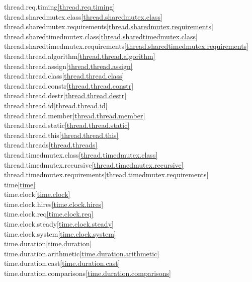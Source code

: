\begin{multicols}{2}
thread.req.timing\quad\ref{thread.req.timing}\\
thread.sharedmutex.class\quad\ref{thread.sharedmutex.class}\\
thread.sharedmutex.requirements\quad\ref{thread.sharedmutex.requirements}\\
thread.sharedtimedmutex.class\quad\ref{thread.sharedtimedmutex.class}\\
thread.sharedtimedmutex.requirements\quad\ref{thread.sharedtimedmutex.requirements}\\
thread.thread.algorithm\quad\ref{thread.thread.algorithm}\\
thread.thread.assign\quad\ref{thread.thread.assign}\\
thread.thread.class\quad\ref{thread.thread.class}\\
thread.thread.constr\quad\ref{thread.thread.constr}\\
thread.thread.destr\quad\ref{thread.thread.destr}\\
thread.thread.id\quad\ref{thread.thread.id}\\
thread.thread.member\quad\ref{thread.thread.member}\\
thread.thread.static\quad\ref{thread.thread.static}\\
thread.thread.this\quad\ref{thread.thread.this}\\
thread.threads\quad\ref{thread.threads}\\
thread.timedmutex.class\quad\ref{thread.timedmutex.class}\\
thread.timedmutex.recursive\quad\ref{thread.timedmutex.recursive}\\
thread.timedmutex.requirements\quad\ref{thread.timedmutex.requirements}\\
time\quad\ref{time}\\
time.clock\quad\ref{time.clock}\\
time.clock.hires\quad\ref{time.clock.hires}\\
time.clock.req\quad\ref{time.clock.req}\\
time.clock.steady\quad\ref{time.clock.steady}\\
time.clock.system\quad\ref{time.clock.system}\\
time.duration\quad\ref{time.duration}\\
time.duration.arithmetic\quad\ref{time.duration.arithmetic}\\
time.duration.cast\quad\ref{time.duration.cast}\\
time.duration.comparisons\quad\ref{time.duration.comparisons}\\

\end{multicols}
